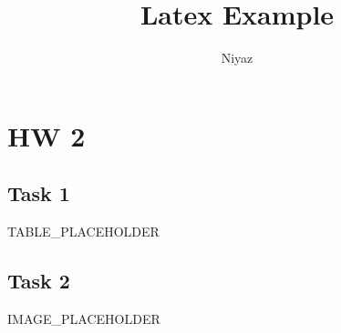 \documentclass{article}
\title{Latex Example}
\author{Niyaz}
\begin{document}
\maketitle

\section{HW 2}

\subsection{Task 1}

TABLE_PLACEHOLDER

\subsection{Task 2}

IMAGE_PLACEHOLDER
\end{document}
